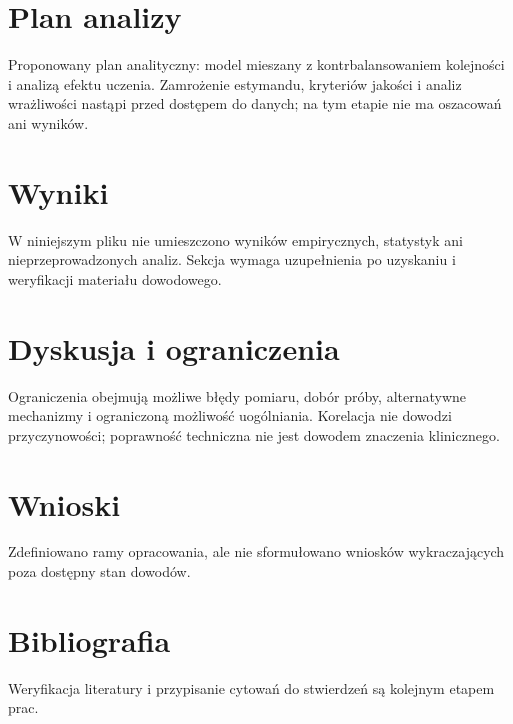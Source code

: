 \documentclass[11pt,a4paper]{article}
\begin{document}
\section{Plan analizy}

Proponowany plan analityczny: model mieszany z kontrbalansowaniem kolejności i analizą efektu uczenia. Zamrożenie estymandu, kryteriów jakości i analiz wrażliwości nastąpi przed dostępem do danych; na tym etapie nie ma oszacowań ani wyników.

\section{Wyniki}

W niniejszym pliku nie umieszczono wyników empirycznych, statystyk ani nieprzeprowadzonych analiz. Sekcja wymaga uzupełnienia po uzyskaniu i weryfikacji materiału dowodowego.

\section{Dyskusja i ograniczenia}

Ograniczenia obejmują możliwe błędy pomiaru, dobór próby, alternatywne mechanizmy i ograniczoną możliwość uogólniania. Korelacja nie dowodzi przyczynowości; poprawność techniczna nie jest dowodem znaczenia klinicznego.

\section{Wnioski}

Zdefiniowano ramy opracowania, ale nie sformułowano wniosków wykraczających poza dostępny stan dowodów.

\section*{Bibliografia}

Weryfikacja literatury i przypisanie cytowań do stwierdzeń są kolejnym etapem prac.
\end{document}
